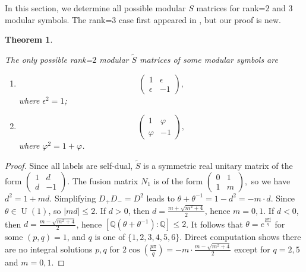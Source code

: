 \documentclass[12pt,psamsfonts]{amsart}
\newcommand{\e}{{\epsilon}}
\newcommand{\Q}{\mathbb Q}
\DeclareMathOperator{\U}{U}
\newcommand{\tS}{\tilde{S}}
\numberwithin{equation}{section}
\newtheorem{theorem}{Theorem}[section]
\theoremstyle{definition}
\begin{document}
In this section, we determine all possible modular $S$ matrices
for rank=$2$ and $3$ modular symbols.  The rank=$3$ case first appeared in \cite{CP}, but our
proof is new.

\begin{theorem}\label{Srank2}


The only possible rank=$2$ modular $\tS$ matrices of some modular
symbols are

\begin{enumerate}


\item
\[
 \begin{pmatrix}
   1& \e\\
   \e & -1
 \end{pmatrix},
 \]
 where $\e^2=1$;

\item

 \[
 \begin{pmatrix}
   1& \varphi \\
   \varphi & -1
 \end{pmatrix},
 \] where $\varphi^2=1+\varphi$.

 \end{enumerate}

 \end{theorem}


\begin{proof}

Since all labels are self-dual, $\tS$ is a symmetric real unitary
matrix of the form $
 \begin{pmatrix}
   1& d\\
   d& -1
 \end{pmatrix}
 $.  The fusion matrix $N_1$ is of the form $
 \begin{pmatrix}
   0& 1\\
   1 & m
 \end{pmatrix},$  so we have $d^2=1+md$.  Simplifying
 $D_+D_{-}=D^2$ leads to $\theta+\theta^{-1}=1-d^2=-m\cdot d$.
 Since $\theta \in \U(1)$, so $|md|\leq 2$.
 If $d>0$, then $d=\frac{m+\sqrt{m^2+4}}{2}$, hence $m=0,1$.  If $d<0$,
 then $d=\frac{m-\sqrt{m^2+4}}{2}$, hence $[\Q(\theta+\theta^{-1}):\Q]\leq 2$.  It follows that
 $\theta=e^{\frac{p \pi i}{q}}$ for some $(p,q)=1$, and $q$ is one of $\{1,2,3,4,5,6\}$.  Direct computation
 shows there are no integral solutions $p,q$ for $2\cos(\frac{p\pi}{q})=-m\cdot \frac{m-\sqrt{m^2+4}}{2}$
  except for $q=2,5$ and $m=0,1$.

 \end{proof}
\end{document}
